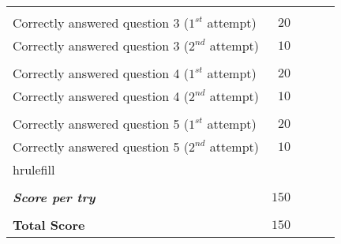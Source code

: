\begin{tabularx}{\textwidth}{X r c c c }
	& & & & \\ 
	Correctly answered question 3 ($1^{st}$ attempt) & $20$ & \hrulefill & \hrulefill & \hrulefill \\
	Correctly answered question 3 ($2^{nd}$ attempt) & $10$ & \hrulefill & \hrulefill & \hrulefill \\
	& & & & \\ 
	Correctly answered question 4 ($1^{st}$ attempt) & $20$ & \hrulefill & \hrulefill & \hrulefill \\
	Correctly answered question 4 ($2^{nd}$ attempt) & $10$ & \hrulefill & \hrulefill & \hrulefill \\
	& & & & \\ 
	Correctly answered question 5 ($1^{st}$ attempt) & $20$ & \hrulefill & \hrulefill & \hrulefill \\
	Correctly answered question 5 ($2^{nd}$ attempt) & $10$ & \hrulefill & \hrulefill & \hrulefill \\
	hrulefill \\ \hline
	& & & & \\ 
	\textit{\textbf{Score per try}} & $150$ & \hrulefill & \hrulefill & \hrulefill \\ 
	& & & & \\ 
	\textbf{Total Score} & $150$ & & & \\ \cline{3-5}

\end{tabularx}\\

